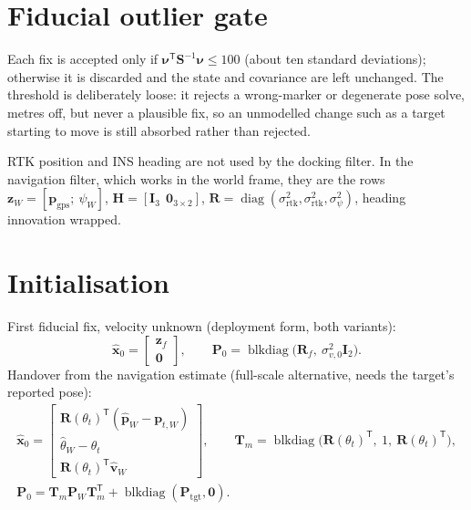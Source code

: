 \documentclass[11pt,a4paper]{article}
\newcommand{\vect}[1]{\bm{#1}}
\newcommand{\mat}[1]{\bm{#1}}
\newcommand{\T}{^{\mathsf{T}}}
\newcommand{\diag}{\operatorname{diag}}
\DeclareMathOperator{\blkdiag}{blkdiag}
\newcommand{\Rot}{\mat{R}}
\newcommand{\hx}{\hat{\vect{x}}}
\begin{document}
\section{Fiducial outlier gate}
Each fix is accepted only if $\vect\nu\T\mat S^{-1}\vect\nu \le 100$ (about ten standard deviations); otherwise it is discarded and the state and covariance are left unchanged. The threshold is deliberately loose: it rejects a wrong-marker or degenerate pose solve, metres off, but never a plausible fix, so an unmodelled change such as a target starting to move is still absorbed rather than rejected.

RTK position and INS heading are not used by the docking filter. In the navigation filter, which works in the world frame, they are the rows
$\vect z_W = [\vect p_{\mathrm{gps}};\ \psi_W]$, $\mat H = [\mat I_3\ \ \mat 0_{3\times 2}]$, $\mat R = \diag(\sigma_{\mathrm{rtk}}^2,\sigma_{\mathrm{rtk}}^2,\sigma_\psi^2)$, heading innovation wrapped.

\section{Initialisation}
First fiducial fix, velocity unknown (deployment form, both variants):
\begin{equation}
\hx_0 = \begin{bmatrix}\vect z_f \\ \vect 0\end{bmatrix},
\qquad
\mat P_0 = \blkdiag\!\big(\mat R_f,\ \sigma_{v,0}^2\mat I_2\big).
\end{equation}
Handover from the navigation estimate (full-scale alternative, needs the target's reported pose):
\begin{gather}
\hx_0 = \begin{bmatrix}\Rot(\theta_t)\T(\hat{\vect p}_W - \vect p_{t,W}) \\ \hat\theta_W - \theta_t \\ \Rot(\theta_t)\T\hat{\vect v}_W\end{bmatrix},
\qquad
\mat T_m = \blkdiag\!\big(\Rot(\theta_t)\T,\ 1,\ \Rot(\theta_t)\T\big),\\
\mat P_0 = \mat T_m\mat P_W\mat T_m\T + \blkdiag(\mat P_{\mathrm{tgt}},\mat 0).
\end{gather}
\end{document}
